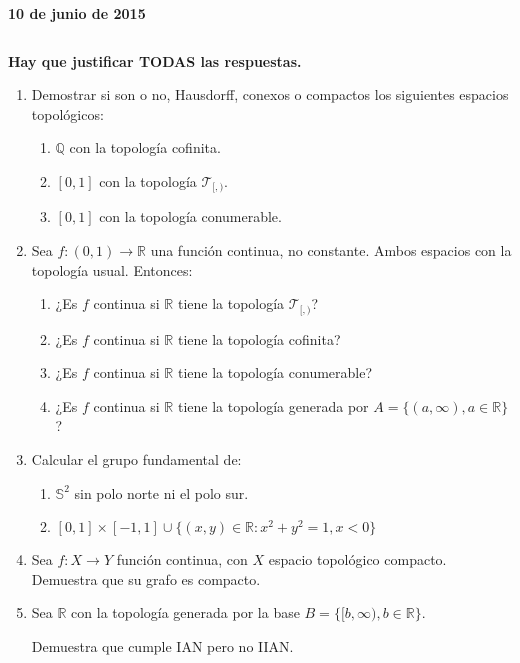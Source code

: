 \documentclass[12pt,spanish,a4paper]{article}
\newcommand{\real}[0]{\mathbb{R}}
\newcommand{\rac}[0]{\mathbb{Q}}
\newcommand{\topl}[0]{\mathcal{T}}
\newcommand{\sphere}[0]{\mathbb{S}}
\newcommand{\set}[1]{{\{ #1 \}}}
\newcommand{\appl}[3]{{{#1} : {#2} \rightarrow {#3}}}
\begin{document}

\hfill{\bf 10 de junio de 2015}

$ $

{\bf Hay que justificar TODAS las respuestas.}

\begin{enumerate}[label=\textbf{\arabic*.}]
	\item Demostrar si son o no, Hausdorff, conexos o compactos los siguientes espacios topológicos:
		\begin{enumerate}[label=\textbf{\alph*)}]
			\item $\rac$ con la topología cofinita.

			\item $[0,1]$ con la topología $\topl_{[,)}$.

			\item $[0,1]$ con la topología conumerable.

		\end{enumerate}

	\item Sea $\appl{f}{(0,1)}{\real}$ una función continua, no constante. Ambos espacios con la topología usual. Entonces:
		\begin{enumerate}[label=\textbf{\alph*)}]
			\item ¿Es $f$ continua si $\real$ tiene la topología $\topl_{[,)}$?

			\item ¿Es $f$ continua si $\real$ tiene la topología cofinita?

			\item ¿Es $f$ continua si $\real$ tiene la topología conumerable?

			\item ¿Es $f$ continua si $\real$ tiene la topología generada por $A = \set{(a,\infty), a \in \real}$?

		\end{enumerate}

	\item Calcular el grupo fundamental de:
		\begin{enumerate}[label=\textbf{\alph*)}]
			\item $\sphere^2$ sin polo norte ni el polo sur.

			\item $[0,1]\times[-1,1] \cup \set{(x,y) \in \real : x^2 + y^2 = 1, x < 0}$

		\end{enumerate}

	\item Sea $\appl{f}{X}{Y}$ función continua, con $X$ espacio topológico compacto. Demuestra que su grafo es compacto.

	\item Sea $\real$ con la topología generada por la base $B = \set{[b,\infty), b \in \real}$.

	Demuestra que cumple IAN pero no IIAN.

\end{enumerate}
\end{document}
